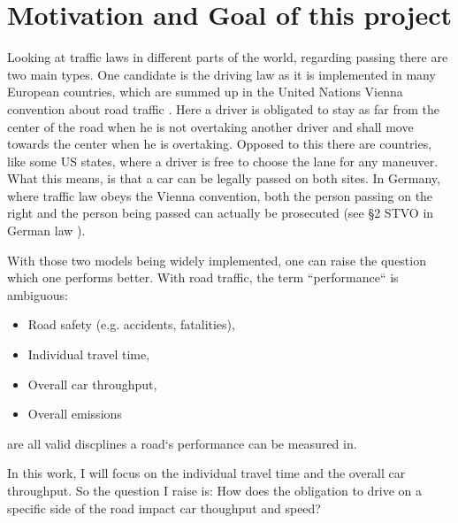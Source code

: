 \section{Motivation and Goal of this project}
\label{sec:goal}
Looking at traffic laws in different parts of the world, regarding passing there are two main types. One candidate
is the driving law as it is implemented in many European countries, which are summed up in the United
Nations Vienna convention about road traffic \cite{vienna-treaty}. Here a driver is obligated to stay as far from the
center of the road when he is not overtaking another driver and shall move towards the center when he is overtaking.
Opposed to this there are countries, like some US states, where a driver is free to choose the lane for any maneuver.
What this means, is that a car can be legally passed on both sites. In Germany, where traffic law obeys the Vienna
convention, both the person passing on the right and the person being passed can actually be prosecuted (see §2 STVO in 
German law \cite{STVO2}).

With those two models being widely implemented, one can raise the question which one performs better. With road traffic, the
term ``performance`` is ambiguous:
\begin{itemize}
  \item Road safety (e.g. accidents, fatalities),
  \item Individual travel time,
  \item Overall car throughput,
  \item Overall emissions
\end{itemize}
are all valid discplines a road`s performance can be measured in.

In this work, I will focus on the individual travel time and the overall car throughput. So the question I raise is:
\newline
How does the obligation to drive on a specific side of the road impact car thoughput and speed?

